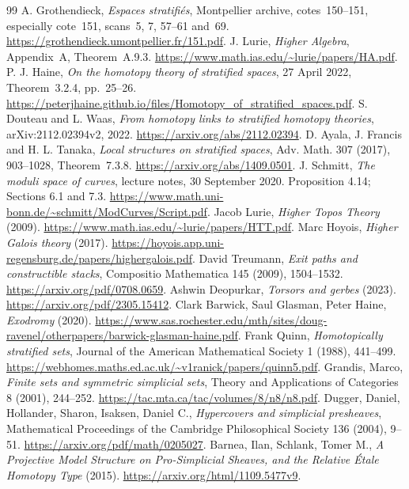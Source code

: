 \documentclass[11pt,a4paper]{article}
\theoremstyle{definition}
\begin{document}
\begin{thebibliography}{99}
 A. Grothendieck, \emph{Espaces stratifi\'es}, Montpellier archive, cotes~150--151, especially cote~151, scans~5, 7, 57--61 and~69. \url{https://grothendieck.umontpellier.fr/151.pdf}.
 J. Lurie, \emph{Higher Algebra}, Appendix~A, Theorem~A.9.3. \url{https://www.math.ias.edu/~lurie/papers/HA.pdf}.
 P. J. Haine, \emph{On the homotopy theory of stratified spaces}, 27 April 2022, Theorem~3.2.4, pp.~25--26. \url{https://peterjhaine.github.io/files/Homotopy_of_stratified_spaces.pdf}.
 S. Douteau and L. Waas, \emph{From homotopy links to stratified homotopy theories}, arXiv:2112.02394v2, 2022. \url{https://arxiv.org/abs/2112.02394}.
 D. Ayala, J. Francis and H. L. Tanaka, \emph{Local structures on stratified spaces}, Adv. Math. 307 (2017), 903--1028, Theorem~7.3.8. \url{https://arxiv.org/abs/1409.0501}.
 J. Schmitt, \emph{The moduli space of curves}, lecture notes, 30 September 2020. Proposition 4.14; Sections 6.1 and 7.3. \url{https://www.math.uni-bonn.de/~schmitt/ModCurves/Script.pdf}.
 Jacob Lurie, \emph{Higher Topos Theory} (2009). \url{https://www.math.ias.edu/~lurie/papers/HTT.pdf}.
 Marc Hoyois, \emph{Higher Galois theory} (2017). \url{https://hoyois.app.uni-regensburg.de/papers/highergalois.pdf}.
 David Treumann, \emph{Exit paths and constructible stacks}, Compositio Mathematica 145 (2009), 1504--1532. \url{https://arxiv.org/pdf/0708.0659}.
 Ashwin Deopurkar, \emph{Torsors and gerbes} (2023). \url{https://arxiv.org/pdf/2305.15412}.
 Clark Barwick, Saul Glasman, Peter Haine, \emph{Exodromy} (2020). \url{https://www.sas.rochester.edu/mth/sites/doug-ravenel/otherpapers/barwick-glasman-haine.pdf}.
 Frank Quinn, \emph{Homotopically stratified sets}, Journal of the American Mathematical Society 1 (1988), 441--499. \url{https://webhomes.maths.ed.ac.uk/~v1ranick/papers/quinn5.pdf}.
 Grandis, Marco, \emph{Finite sets and symmetric simplicial sets}, Theory and Applications of Categories 8 (2001), 244--252. \url{https://tac.mta.ca/tac/volumes/8/n8/n8.pdf}.
 Dugger, Daniel, Hollander, Sharon, Isaksen, Daniel C., \emph{Hypercovers and simplicial presheaves}, Mathematical Proceedings of the Cambridge Philosophical Society 136 (2004), 9--51. \url{https://arxiv.org/pdf/math/0205027}.
 Barnea, Ilan, Schlank, Tomer M., \emph{A Projective Model Structure on Pro-Simplicial Sheaves, and the Relative {\'E}tale Homotopy Type} (2015). \url{https://arxiv.org/html/1109.5477v9}.

\end{thebibliography}
\end{document}
